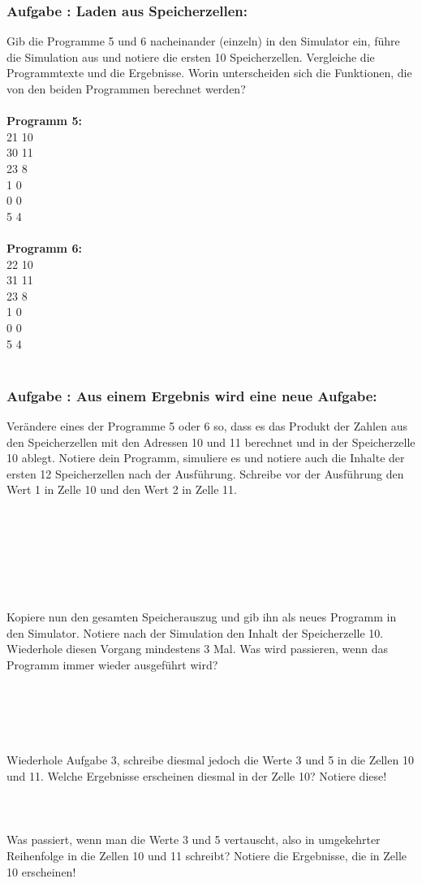 \documentclass[a4paper,12pt]{article}
\newcounter{aufgnr}
\begin{document}
\subsubsection*{Aufgabe \theaufgnr: Laden aus Speicherzellen:}
Gib die Programme 5 und 6 nacheinander (einzeln) in den Simulator ein, führe die Simulation aus und notiere die ersten 10 Speicherzellen. Vergleiche die Programmtexte und die Ergebnisse. Worin unterscheiden sich die Funktionen, die von den beiden Programmen berechnet werden?\\
\\
\textbf{Programm 5:}\\
21 10\\
30 11\\
23 8\\
1 0\\
0 0\\
5 4\\
\\
\textbf{Programm 6:}\\
22 10\\
31 11\\
23 8\\
1 0\\
0 0\\
5 4\\
\\
\subsubsection*{Aufgabe \theaufgnr: Aus einem Ergebnis wird eine neue Aufgabe:}
Verändere eines der Programme 5 oder 6 so, dass es das Produkt der Zahlen aus den Speicherzellen mit den Adressen 10 und 11 berechnet und in der Speicherzelle 10 ablegt. Notiere dein Programm, simuliere es und notiere auch die Inhalte der ersten 12 Speicherzellen nach der Ausführung. Schreibe vor der Ausführung den Wert 1 in Zelle 10 und den Wert 2 in Zelle 11.\\
\\
\\
\\
\\
\\
\\
\\
Kopiere nun den gesamten Speicherauszug und gib ihn als neues Programm in den Simulator. Notiere nach der Simulation den Inhalt der Speicherzelle 10. Wiederhole diesen Vorgang mindestens 3 Mal. Was wird passieren, wenn das Programm immer wieder ausgeführt wird?\\
\\
\\
\\
\\
\\
Wiederhole Aufgabe 3, schreibe diesmal jedoch die Werte 3 und 5 in die Zellen 10 und 11. Welche Ergebnisse erscheinen diesmal in der Zelle 10? Notiere diese!\\
\\
\\
\\
Was passiert, wenn man die Werte 3 und 5 vertauscht, also in umgekehrter Reihenfolge in die Zellen 10 und 11 schreibt? Notiere die Ergebnisse, die in Zelle 10 erscheinen!
\end{document}
